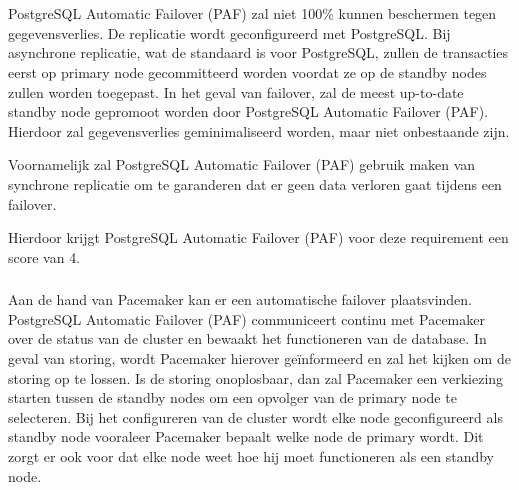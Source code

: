 
\section{}
\label{sec:Requirements}

\subsection{}
\label{subsec:Must have}


\subsubsection{}
\label{subsubsec:Ondersteuning van replicatie}

PostgreSQL Automatic Failover (PAF) zal niet 100\% kunnen beschermen tegen gegevensverlies. De replicatie wordt geconfigureerd met PostgreSQL. Bij asynchrone replicatie, wat de standaard is voor PostgreSQL, zullen de transacties eerst op primary node gecommitteerd worden voordat ze op de standby nodes zullen worden toegepast. In het geval van failover, zal de meest up-to-date standby node gepromoot worden door PostgreSQL Automatic Failover (PAF). Hierdoor zal gegevensverlies geminimaliseerd worden, maar niet onbestaande zijn. 

Voornamelijk zal PostgreSQL Automatic Failover (PAF) gebruik maken van synchrone replicatie om te garanderen dat er geen data verloren gaat tijdens een failover.

Hierdoor krijgt PostgreSQL Automatic Failover (PAF) voor deze requirement  een score van 4.

\subsubsection{}
\label{subsubsec:Ondersteuning van failover}

Aan de hand van Pacemaker kan er een automatische failover plaatsvinden. PostgreSQL Automatic Failover (PAF) communiceert continu met Pacemaker over de status van de cluster en bewaakt het functioneren van de database. In geval van storing, wordt Pacemaker hierover geïnformeerd en zal het kijken om de storing op te lossen. Is de storing onoplosbaar, dan zal Pacemaker een verkiezing starten tussen de standby nodes om een opvolger van de primary node te selecteren.
Bij het configureren van de cluster wordt elke node geconfigureerd als standby node vooraleer Pacemaker bepaalt welke node de primary wordt. Dit zorgt er ook voor dat elke node weet hoe hij moet functioneren als een standby node.

